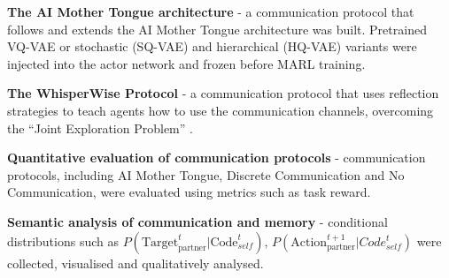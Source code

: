 \textbf{The AI Mother Tongue architecture} - a communication protocol that follows and extends the AI Mother Tongue architecture \cite{AIMotherTongue} was built.
Pretrained VQ-VAE or stochastic (SQ-VAE) and hierarchical (HQ-VAE) variants were injected into the actor network and frozen before MARL training.

\textbf{The WhisperWise Protocol} - a communication protocol that uses reflection strategies to teach agents how to use the communication channels, overcoming the ``Joint Exploration Problem'' \cite{Biases}.

\textbf{Quantitative evaluation of communication protocols} - communication protocols, including AI Mother Tongue, Discrete Communication and No Communication, were evaluated using metrics such as task reward.

\textbf{Semantic analysis of communication and memory} - conditional distributions such as $P(\text{Target}_{\text{partner}}^{t} | \text{Code}_{self}^t)$, $P(\text{Action}_{\text{partner}}^{t+1} | Code_{self}^t)$ were collected, visualised and qualitatively analysed.
